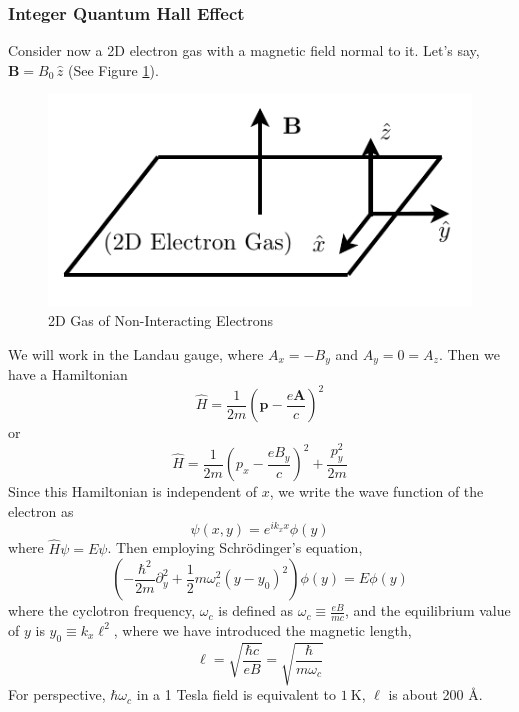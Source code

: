 \documentclass{article}
\begin{document}
	\subsubsection{Integer Quantum Hall Effect}
	Consider now a 2D electron gas with a magnetic field normal to it. Let's say, $\mathbf{B}=B_0\,\hat{z}$ (See Figure \ref{2dGas}).
	\begin{figure}[h]
		\centering\includegraphics{2dGas.pdf}
		\caption{2D Gas of Non-Interacting Electrons}
		\label{2dGas}
	\end{figure} We will work in the Landau gauge, where $A_x=-B_y$ and $A_y=0=A_z$. Then we have a Hamiltonian
	$$\hat{H}=\frac{1}{2m}\left(\mathbf{p}-\frac{e\mathbf{A}}{c}\right)^2$$
	or
	$$\hat{H}=\frac{1}{2m}\left(p_x-\frac{eB_y}{c}\right)^2+\frac{p_y^2}{2m}$$
	Since this Hamiltonian is independent of $x$, we write the wave function of the electron as
	$$\psi(x,y)=e^{ik_xx}\phi(y)$$
	where $\hat{H}\psi=E\psi$. Then employing Schr\"odinger's equation,
	$$\left(-\frac{\hbar^2}{2m}\partial_y^2+\frac{1}{2}m\omega_c^2(y-y_0)^2\right)\phi(y)=E\phi(y)$$
	where the cyclotron frequency, $\omega_c$ is defined as $\omega_c\equiv \frac{eB}{mc}$, and the equilibrium value of $y$ is $y_0\equiv k_x\ell^2$, where we have introduced the magnetic length,
	$$\ell=\sqrt{\frac{\hbar c}{eB}}=\sqrt{\frac{\hbar}{m\omega_c}}$$
	For perspective, $\hbar\omega_c$ in a 1 Tesla field is equivalent to $1\ \mathrm{K}$, $\ell$ is about 200 \AA.
	
\end{document}
